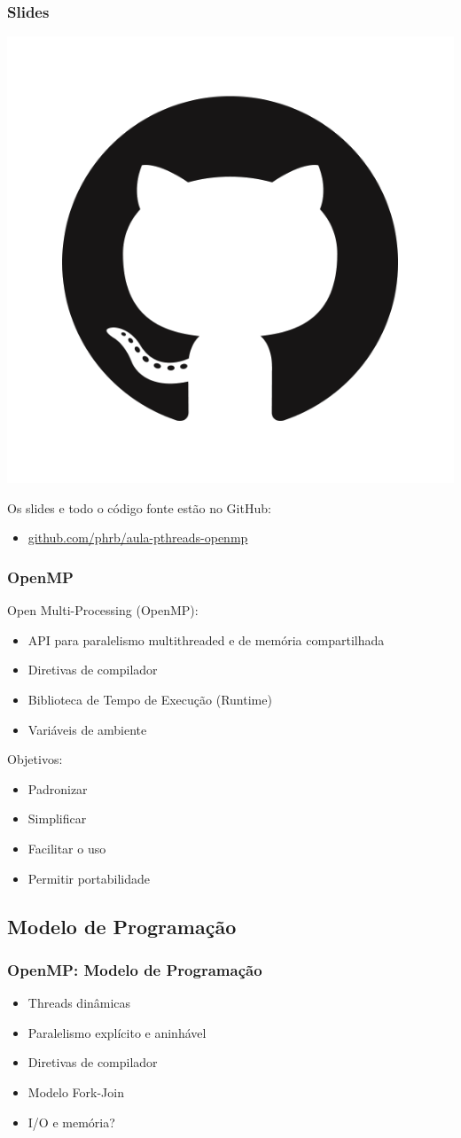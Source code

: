 \documentclass[10pt, compress]{beamer}
\begin{document}
\begin{frame}
    \frametitle{Slides}
    \begin{center}
        \includegraphics[width=.18\textwidth]{github}
    \end{center}
    Os slides e todo o código fonte estão no \alert{GitHub}:

    \begin{itemize}
        \item \url{github.com/phrb/aula-pthreads-openmp}
    \end{itemize}
\end{frame}

\begin{frame}
    \frametitle{OpenMP}
    \alert{Open Multi-Processing} (OpenMP):
    \begin{itemize}
        \item API para paralelismo \alert{multithreaded} e de \alert{memória
            compartilhada}
        \item \alert{Diretivas de compilador}
        \item Biblioteca de \alert{Tempo de Execução} (\alert{Runtime})
        \item Variáveis de ambiente
    \end{itemize}

    \pause

    Objetivos:
    \begin{itemize}
        \item \alert{Padronizar}
        \item \alert{Simplificar}
        \item \alert{Facilitar o uso}
        \item \alert{Permitir portabilidade}
    \end{itemize}
\end{frame}

\subsection{Modelo de Programação}

\begin{frame}
    \frametitle{OpenMP: Modelo de Programação}
    \begin{itemize}
        \item Threads \alert{dinâmicas}
        \item Paralelismo \alert{explícito e aninhável}
        \item \alert{Diretivas} de compilador
        \item Modelo \alert{Fork-Join}
        \item I/O e memória?
    \end{itemize}
\end{frame}
\end{document}

